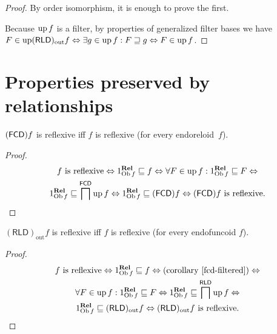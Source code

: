 \begin{proof}
  By order isomorphism, it is enough to prove the first.
  
  Because $\operatorname{up} f$ is a filter, by properties of generalized filter bases
  we have $F \in \operatorname{up} (\mathsf{RLD})_{\mathrm{out}} f
  \Leftrightarrow \exists g \in \operatorname{up} f : F \sqsupseteq g \Leftrightarrow
  F \in \operatorname{up} f$.
\end{proof}

\section{Properties preserved by relationships}

\begin{prop}
  $(\mathsf{FCD}) f$ is reflexive iff $f$ is reflexive (for every
  endoreloid~$f$).
\end{prop}

\begin{proof}
\begin{multline*}
  \text{$f$ is reflexive} \Leftrightarrow
  1^{\mathbf{Rel}}_{\operatorname{Ob} f} \sqsubseteq f \Leftrightarrow
  \forall F \in \operatorname{up} f : 1^{\mathbf{Rel}}_{\operatorname{Ob} f}
  \sqsubseteq F \Leftrightarrow \\ 1^{\mathbf{Rel}}_{\operatorname{Ob} f}
  \sqsubseteq \bigsqcap^{\mathsf{FCD}} \operatorname{up} f \Leftrightarrow
  1^{\mathbf{Rel}}_{\operatorname{Ob} f} \sqsubseteq (\mathsf{FCD}) f
  \Leftrightarrow \text{$(\mathsf{FCD}) f$ is reflexive}.
\end{multline*}
\end{proof}

\begin{prop}
  $(\mathsf{RLD})_{\operatorname{out}} f$ is reflexive iff $f$ is reflexive
  (for every endofuncoid $f$).
\end{prop}

\begin{proof}
\begin{multline*}
  \text{$f$ is reflexive} \Leftrightarrow
  1^{\mathbf{Rel}}_{\operatorname{Ob} f} \sqsubseteq f \Leftrightarrow
  \text{(corollary~\ref{fcd-filtered})} \Leftrightarrow \\ \forall F \in \operatorname{up} f :
  1^{\mathbf{Rel}}_{\operatorname{Ob} f} \sqsubseteq F \Leftrightarrow
  1^{\mathbf{Rel}}_{\operatorname{Ob} f} \sqsubseteq
  \bigsqcap^{\mathsf{RLD}} \operatorname{up} f \Leftrightarrow \\
  1^{\mathbf{Rel}}_{\operatorname{Ob} f} \sqsubseteq
  (\mathsf{RLD})_{\operatorname{out}} f \Leftrightarrow
  \text{$(\mathsf{RLD})_{\operatorname{out}}f$ is reflexive}.
\end{multline*}
\end{proof}

